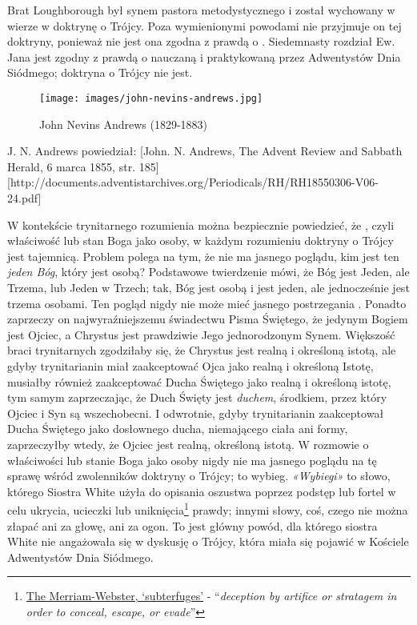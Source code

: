 Brat Loughborough był synem pastora metodystycznego i został wychowany w wierze w doktrynę o Trójcy. Poza wymienionymi powodami nie przyjmuje on tej doktryny, ponieważ nie jest ona zgodna z prawdą o . Siedemnasty rozdział Ew. Jana jest zgodny z prawdą o  nauczaną i praktykowaną przez Adwentystów Dnia Siódmego; doktryna o Trójcy nie jest.

\begin{figure}[hp]
    \centering
    \texttt{[image: images/john-nevins-andrews.jpg]}
    \caption*{John Nevins Andrews (1829-1883)}
    \label{fig:j-n-andrews}
\end{figure}

J. N. Andrews powiedział: [John. N. Andrews, The Advent Review and Sabbath Herald, 6 marca 1855, str. 185][http://documents.adventistarchives.org/Periodicals/RH/RH18550306-V06-24.pdf]

W kontekście trynitarnego rozumienia  można bezpiecznie powiedzieć, że , czyli właściwość lub stan Boga jako osoby, w każdym rozumieniu doktryny o Trójcy jest tajemnicą. Problem polega na tym, że nie ma jasnego poglądu, kim jest ten \textit{jeden Bóg}, który jest osobą? Podstawowe twierdzenie mówi, że Bóg jest Jeden, ale Trzema, lub Jeden w Trzech; tak, Bóg jest osobą i jest jeden, ale jednocześnie jest trzema osobami. Ten pogląd nigdy nie może mieć jasnego postrzegania . Ponadto zaprzeczy on najwyraźniejszemu świadectwu Pisma Świętego, że jedynym Bogiem jest Ojciec, a Chrystus jest prawdziwie Jego jednorodzonym Synem. Większość braci trynitarnych zgodziłaby się, że Chrystus jest realną i określoną istotą, ale gdyby trynitarianin miał zaakceptować Ojca jako realną i określoną Istotę, musiałby również zaakceptować Ducha Świętego jako realną i określoną istotę, tym samym zaprzeczając, że Duch Święty jest \textit{duchem}, środkiem, przez który Ojciec i Syn są wszechobecni. I odwrotnie, gdyby trynitarianin zaakceptował Ducha Świętego jako dosłownego ducha, niemającego ciała ani formy, zaprzeczyłby wtedy, że Ojciec jest realną, określoną istotą. W rozmowie o właściwości lub stanie Boga jako osoby nigdy nie ma jasnego poglądu na tę sprawę wśród zwolenników doktryny o Trójcy; to wybieg. \textit{«Wybiegi»} to słowo, którego Siostra White użyła do opisania oszustwa poprzez podstęp lub fortel w celu ukrycia, ucieczki lub uniknięcia\footnote{\href{https://www.merriam-webster.com/dictionary/subterfuges}{The Merriam-Webster, ‘subterfuges’} - “\textit{deception by artifice or stratagem in order to conceal, escape, or evade}”} prawdy; innymi słowy, coś, czego nie można złapać ani za głowę, ani za ogon. To jest główny powód, dla którego siostra White nie angażowała się w dyskusję o Trójcy, która miała się pojawić w Kościele Adwentystów Dnia Siódmego.

